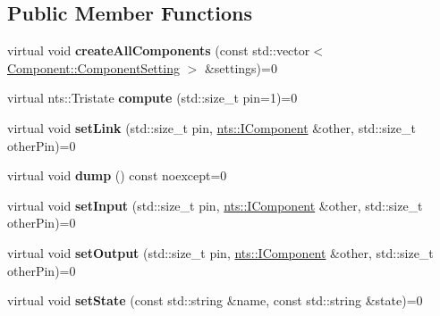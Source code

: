 \subsection*{Public Member Functions}
\begin{DoxyCompactItemize}
\item 
\mbox{\label{classnts_1_1IComponent_a00158e91b34034cfc41902385f25da43}} 
virtual void {\bfseries create\+All\+Components} (const std\+::vector$<$ \mbox{\hyperlink{structComponent_1_1ComponentSetting}{Component\+::\+Component\+Setting}} $>$ \&settings)=0
\item 
\mbox{\label{classnts_1_1IComponent_accdf4bbba897aa2315672f85600273d6}} 
virtual nts\+::\+Tristate {\bfseries compute} (std\+::size\+\_\+t pin=1)=0
\item 
\mbox{\label{classnts_1_1IComponent_a3208febc84b2056013b6d9ac6ed4a7d5}} 
virtual void {\bfseries set\+Link} (std\+::size\+\_\+t pin, \mbox{\hyperlink{classnts_1_1IComponent}{nts\+::\+I\+Component}} \&other, std\+::size\+\_\+t other\+Pin)=0
\item 
\mbox{\label{classnts_1_1IComponent_abf1d98d16037a91b429798d4a1006516}} 
virtual void {\bfseries dump} () const noexcept=0
\item 
\mbox{\label{classnts_1_1IComponent_a09c9d36dbe8217e718e81a2c715bb8cf}} 
virtual void {\bfseries set\+Input} (std\+::size\+\_\+t pin, \mbox{\hyperlink{classnts_1_1IComponent}{nts\+::\+I\+Component}} \&other, std\+::size\+\_\+t other\+Pin)=0
\item 
\mbox{\label{classnts_1_1IComponent_ab68b216d6ccb06b02e548d7a4a70a189}} 
virtual void {\bfseries set\+Output} (std\+::size\+\_\+t pin, \mbox{\hyperlink{classnts_1_1IComponent}{nts\+::\+I\+Component}} \&other, std\+::size\+\_\+t other\+Pin)=0
\item 
\mbox{\label{classnts_1_1IComponent_a73f8805b772a85bfefb826ceb0d233f3}} 
virtual void {\bfseries set\+State} (const std\+::string \&name, const std\+::string \&state)=0
\item 
\mbox{\label{classnts_1_1IComponent_a688f0040fde588087f2db05b8127a9fb}} 

\end{DoxyCompactItemize}
